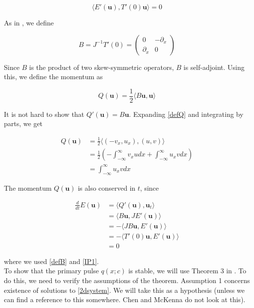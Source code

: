 \documentclass[12pt]{article}
\begin{document}
\begin{equation}\label{IP1}
\langle E'(\textbf{u}), T'(0) \textbf{u} \rangle = 0
\end{equation}

As in \cite{Grillakis1987}, we define 

\begin{equation}\label{defB}
B = J^{-1} T'(0) = \begin{pmatrix}0 & -\partial_x \\ \partial_x & 0\end{pmatrix}
\end{equation}

Since $B$ is the product of two skew-symmetric operators, $B$ is self-adjoint. Using this, we define the momentum as

\begin{equation}\label{defQ}
Q(\textbf{u}) = \frac{1}{2}\langle B \textbf{u}, \textbf{u} \rangle
\end{equation}

It is not hard to show that $Q'(\textbf{u}) = B \textbf{u}$. Expanding \eqref{defQ} and integrating by parts, we get

\begin{align*}
Q(\textbf{u}) &= \frac{1}{2}\langle (-v_x, u_x), (u, v) \rangle \\
&= \frac{1}{2} \left( -\int_{-\infty}^\infty v_x u dx + \int_{-\infty}^\infty u_x v dx \right) \\
&= \int_{-\infty}^\infty u_x v dx
\end{align*}

The momentum $Q(\textbf{u})$ is also conserved in $t$, since

\begin{align*}
\frac{d}{dt} E(\textbf{u}) &= \langle Q'(\textbf{u}), \textbf{u}_t \rangle \\ 
&= \langle B \textbf{u}, J E'(\textbf{u}) \rangle \\
&= -\langle J B \textbf{u}, E'(\textbf{u}) \rangle \\
&= -\langle T'(0) \textbf{u}, E'(\textbf{u}) \rangle \\
&= 0
\end{align*}

where we used \eqref{defB} and \eqref{IP1}.\\

To show that the primary pulse $q(x; c)$ is stable, we will use Theorem 3 in \cite{Grillakis1987}. To do this, we need to verify the assumptions of the theorem. Assumption 1 concerns existence of solutions to \eqref{2dsystem}. We will take this as a hypothesis (unless we can find a reference to this somewhere. Chen and McKenna do not look at this).
\end{document}
